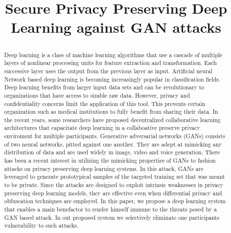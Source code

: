 \documentclass[conference]{IEEEtran}
\begin{document}
\title{{Secure Privacy Preserving Deep Learning against GAN attacks}\\
\author{
\and
{}
}
}
\maketitle

\begin{abstract}
Deep learning is a class of machine learning algorithms that use a cascade of multiple layers of nonlinear processing units for feature extraction and transformation. Each successive layer uses the output from the previous layer as input. Artificial neural Network based deep learning is becoming increasingly popular in classification fields. Deep learning benefits from larger input data sets and can be revolutionary to organizations that have access to sizable raw data. However, privacy and confidentiality concerns limit the application of this tool. This prevents certain organization such as medical institutions to fully benefit from sharing their data. In the recent years, some researchers have proposed decentralized collaborative learning architectures that capacitate deep learning in a collaboative preserve privacy enviroment for multiple participants. 
Generative adversarial networks (GANs) consists of two neural networks, pitted against one another. They are adept at mimicking any distribution of data and are used widely in image, video and voice generation. 
There has been a recent interest in utilizing the mimicking properties of GANs to fashion attacks on privacy preserving deep learning systems. In this attack, GANs are leveraged to generate prototypical samples of the targeted training set that was meant to be private. Since the attacks are designed to exploit intrinsic weaknesses in privacy preserving deep learning models, they are effective even when differential privacy and obfuscation techniques are employed.
In this paper, we propose a deep learning system that enables a main benefactor to render himself immune to the threats posed by a GAN based attack. In out proposed system we selectively eliminate one participants vulnerability to such attacks.  

\end{abstract}
\end{document}
